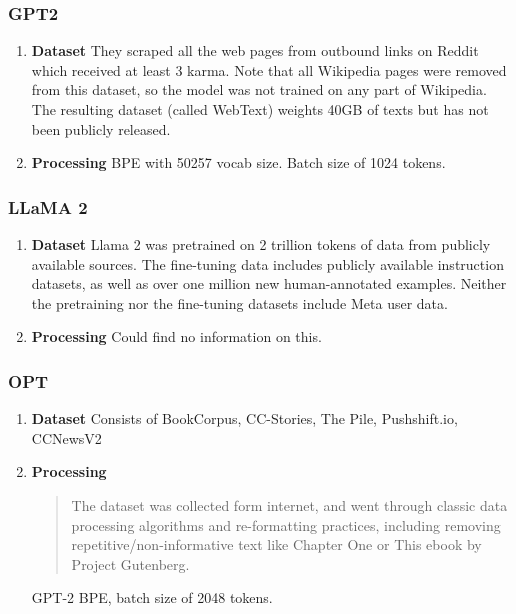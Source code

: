 \documentclass[11pt]{article}
\begin{document}
\subsubsection{GPT2}
\label{sec:orgf63f995}
\begin{enumerate}
\item \textbf{Dataset}
\label{sec:org60be80a}
They scraped all the web pages from outbound links on Reddit which received at least 3 karma. Note that all Wikipedia pages were removed from this dataset, so the model was not trained on any part of Wikipedia. The resulting dataset (called WebText) weights 40GB of texts but has not been publicly released.
\item \textbf{Processing}
\label{sec:orgc4e9307}
BPE with 50257 vocab size. Batch size of 1024 tokens.
\end{enumerate}
\subsubsection{LLaMA 2}
\label{sec:org5f7c9fb}
\begin{enumerate}
\item \textbf{Dataset}
\label{sec:org4081f69}
Llama 2 was pretrained on 2 trillion tokens of data from publicly available sources. The fine-tuning data includes publicly available instruction datasets, as well as over one million new human-annotated examples. Neither the pretraining nor the fine-tuning datasets include Meta user data.
\item \textbf{Processing}
\label{sec:orge0c3a75}
Could find no information on this.
\end{enumerate}
\subsubsection{OPT}
\label{sec:org0b6403b}
\begin{enumerate}
\item \textbf{Dataset}
\label{sec:org744137f}
Consists of BookCorpus, CC-Stories, The Pile, Pushshift.io, CCNewsV2
\item \textbf{Processing}
\label{sec:org807cf4c}
\begin{quote}
The dataset was collected form internet, and went through classic data processing algorithms and re-formatting practices, including removing repetitive/non-informative text like Chapter One or This ebook by Project Gutenberg.
\end{quote}
GPT-2 BPE, batch size of 2048 tokens.
\end{enumerate}
\end{document}

